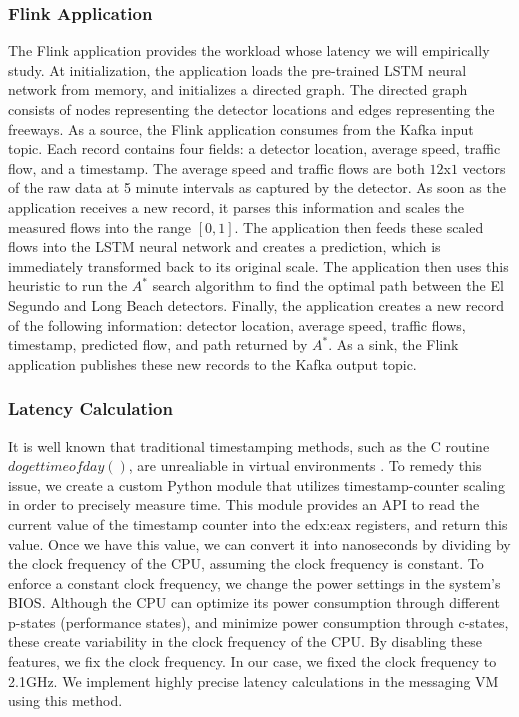 \documentclass{article}
\begin{document}
\subsubsection{Flink Application}
The Flink application provides the workload whose latency we will empirically study. At initialization, the application loads the pre-trained LSTM neural network from memory, and initializes a directed graph. The directed graph consists of nodes representing the detector locations and edges representing the freeways. As a source, the Flink application consumes from the Kafka input topic. Each record contains four fields: a detector location, average speed, traffic flow, and a timestamp. The average speed and traffic flows are both $12$x$1$ vectors of the raw data at 5 minute intervals as captured by the detector. As soon as the application receives a new record, it parses this information and scales the measured flows into the range $[0, 1]$. The application then feeds these scaled flows into the LSTM neural network and creates a prediction, which is immediately transformed back to its original scale. The application then uses this heuristic to run the $A^{*}$ search algorithm to find the optimal path between the El Segundo and Long Beach detectors. Finally, the application creates a new record of the following information: detector location, average speed, traffic flows, timestamp, predicted flow, and path returned by $A^{*}$. As a sink, the Flink application publishes these new records to the Kafka output topic. 
\subsubsection{Latency Calculation}
It is well known that traditional timestamping methods, such as the C routine $dogettimeofday()$, are unrealiable in virtual environments \citep{tsc}. To remedy this issue, we create a custom Python module that utilizes timestamp-counter scaling in order to precisely measure time. This module provides an API to read the current value of the timestamp counter into the edx:eax registers, and return this value. Once we have this value, we can convert it into nanoseconds by dividing by the clock frequency of the CPU, assuming the clock frequency is constant. To enforce a constant clock frequency, we change the power settings in the system's BIOS. Although the CPU can optimize its power consumption through different p-states (performance states), and minimize power consumption through c-states, these create variability in the clock frequency of the CPU. By disabling these features, we fix the clock frequency. In our case, we fixed the clock frequency to 2.1GHz. We implement highly precise latency calculations in the messaging VM using this method. 
\end{document}
